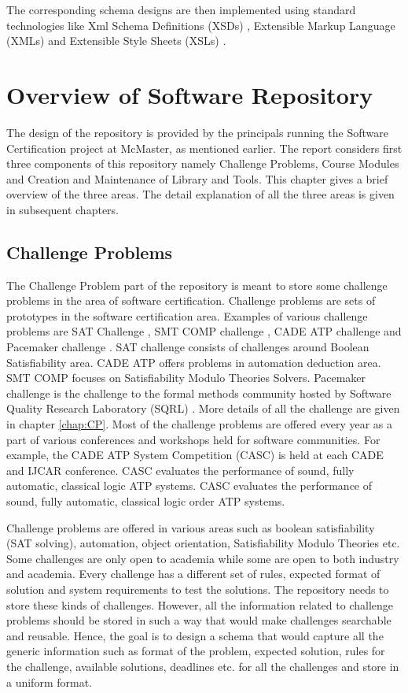 \documentclass[11pt,letterpaper]{report}
\begin{document}
The corresponding schema designs are then implemented using standard technologies like Xml Schema Definitions (XSDs) \cite{XSD}, Extensible Markup Language (XMLs) \cite{XMLDB} and Extensible Style Sheets (XSLs) \cite{olXSL}.

\chapter{Overview of Software Repository}
 The design of the repository is provided by the principals running the Software Certification project at McMaster, as mentioned earlier. The report considers first three components of this repository namely Challenge Problems, Course Modules and Creation and Maintenance of Library and Tools. This chapter gives a brief overview of the three areas. The detail explanation of all the three areas is given in subsequent chapters.

 \section{Challenge Problems}
 \label{sec:CP}
 The Challenge Problem part of the repository is meant to store some challenge problems in the area of software certification. Challenge problems are sets of prototypes in the software certification area. Examples of various challenge problems are SAT Challenge \cite{SAT}, SMT COMP challenge \cite{SMT}, CADE ATP challenge \cite{CADE} and Pacemaker challenge \cite{Pacemaker}. SAT challenge consists of challenges around Boolean Satisfiability area. CADE ATP offers problems in automation deduction area. SMT COMP focuses on Satisfiability Modulo Theories Solvers. Pacemaker challenge is the challenge to the formal methods community hosted by Software Quality Research Laboratory (SQRL) \cite{Pacemaker}. More details of all the challenge are given in chapter \ref{chap:CP}. Most of the challenge problems are offered every year as a part of various conferences and workshops held for software communities. For example, the CADE ATP System Competition (CASC) is held at each CADE and IJCAR conference. CASC evaluates the performance of sound, fully automatic, classical logic ATP systems. CASC evaluates the performance of sound, fully automatic, classical logic order ATP systems. 
 
 Challenge problems are offered in various areas such as boolean satisfiability (SAT solving), automation, object orientation, Satisfiability Modulo Theories etc. Some challenges are only open to academia while some are open to both industry and academia. Every challenge has a different set of rules, expected format of solution and system requirements to test the solutions. The repository needs to store these kinds of challenges. However, all the information related to challenge problems should be stored in such a way that would make challenges searchable and reusable. Hence, the goal is to design a schema that would capture all the generic information such as format of the problem, expected solution, rules for the challenge, available solutions, deadlines etc. for all the challenges and store in a uniform format.
\end{document}
